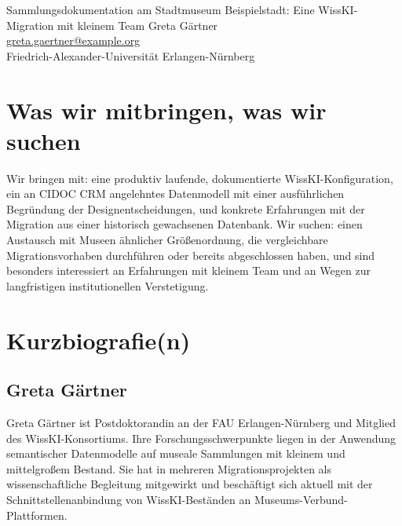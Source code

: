 \begin{beitrag}{Sammlungsdokumentation am Stadtmuseum Beispielstadt: Eine WissKI-Migration mit kleinem Team}{%
Greta Gärtner\, \\
\small \href{mailto:greta.gaertner@example.org}{greta.gaertner@example.org} \\
\small Friedrich-Alexander-Universität Erlangen-Nürnberg
}
\section{Was wir mitbringen, was wir suchen}
Wir bringen mit: eine produktiv laufende, dokumentierte WissKI-Konfiguration, ein an CIDOC CRM angelehntes Datenmodell mit einer ausführlichen Begründung der Designentscheidungen, und konkrete Erfahrungen mit der Migration aus einer historisch gewachsenen Datenbank. Wir suchen: einen Austausch mit Museen ähnlicher Größenordnung, die vergleichbare Migrationsvorhaben durchführen oder bereits abgeschlossen haben, und sind besonders interessiert an Erfahrungen mit kleinem Team und an Wegen zur langfristigen institutionellen Verstetigung.

\end{beitrag}

\section*{Kurzbiografie(n)}

\subsection*{Greta Gärtner}
Greta Gärtner ist Postdoktorandin an der FAU Erlangen-Nürnberg und Mitglied des WissKI-Konsortiums. Ihre Forschungsschwerpunkte liegen in der Anwendung semantischer Datenmodelle auf museale Sammlungen mit kleinem und mittelgroßem Bestand. Sie hat in mehreren Migrationsprojekten als wissenschaftliche Begleitung mitgewirkt und beschäftigt sich aktuell mit der Schnittstellenanbindung von WissKI-Beständen an Museums-Verbund-Plattformen.
